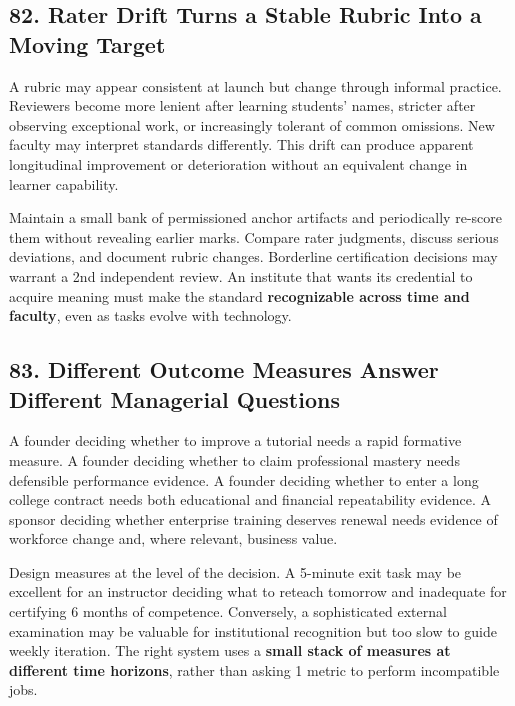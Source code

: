 \subsection*{82. Rater Drift Turns a Stable Rubric Into a Moving Target}

A rubric may appear consistent at launch but change through informal practice. Reviewers become more lenient after learning students' names, stricter after observing exceptional work, or increasingly tolerant of common omissions. New faculty may interpret standards differently. This drift can produce apparent longitudinal improvement or deterioration without an equivalent change in learner capability.

Maintain a small bank of permissioned anchor artifacts and periodically re-score them without revealing earlier marks. Compare rater judgments, discuss serious deviations, and document rubric changes. Borderline certification decisions may warrant a 2nd independent review. An institute that wants its credential to acquire meaning must make the standard \textbf{recognizable across time and faculty}, even as tasks evolve with technology.

\subsection*{83. Different Outcome Measures Answer Different Managerial Questions}

A founder deciding whether to improve a tutorial needs a rapid formative measure. A founder deciding whether to claim professional mastery needs defensible performance evidence. A founder deciding whether to enter a long college contract needs both educational and financial repeatability evidence. A sponsor deciding whether enterprise training deserves renewal needs evidence of workforce change and, where relevant, business value.

Design measures at the level of the decision. A 5-minute exit task may be excellent for an instructor deciding what to reteach tomorrow and inadequate for certifying 6 months of competence. Conversely, a sophisticated external examination may be valuable for institutional recognition but too slow to guide weekly iteration. The right system uses a \textbf{small stack of measures at different time horizons}, rather than asking 1 metric to perform incompatible jobs.
